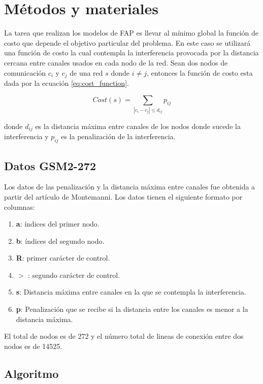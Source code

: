 
\section{Métodos y materiales}

La tarea que realizan los modelos de FAP es llevar al mínimo global la función de costo que depende el objetivo particular del problema. En este caso se utilizará una función de costo la cual contempla la interferencia provocada por la distancia cercana entre canales usados en cada nodo de la red. Sean dos nodos de comunicación $c_i$ y $c_j$ de una red $s$ donde $i\neq j$, entonces la función de costo esta dada por la ecuación \ref{eq:cost_function}.\cite{Lai_2015}

\begin{equation}
    Cost(s) = \sum_{|c_i-c_j| \leq d_{ij}} p_{ij} \label{eq:cost_function}
\end{equation}

donde $d_{ij}$ es la distancia máxima entre canales de los nodos donde sucede la interferencia y $p_{ij}$ es la penalización de la interferencia.

\subsection{Datos GSM2-272}

Los datos de las penalización y la distancia máxima entre canales fue obtenida a partir del artículo de Montemanni\cite{Montemanni_2010,data}. Los datos tienen el siguiente formato por columnas:

\begin{enumerate}
    \item \textbf{a}: índices del primer nodo.
    \item \textbf{b}: índices del segundo nodo.
    \item \textbf{R}: primer carácter de control.
    \item $>$ : segundo carácter de control.
    \item \textbf{s}: Distancia máxima entre canales en la que se contempla la interferencia.
    \item \textbf{p}: Penalización que se recibe si la distancia entre los canales es menor a la distancia máxima.
\end{enumerate}

El total de nodos es de 272 y el número total de lineas de conexión entre dos nodos es de 14525.

\subsection{Algoritmo}

